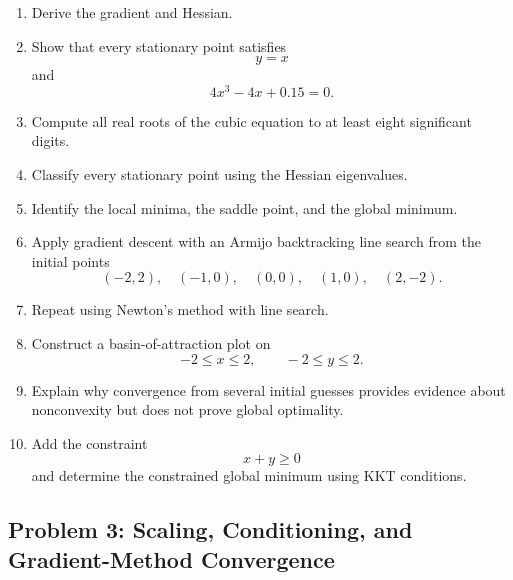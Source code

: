 \begin{enumerate}
    \item Derive the gradient and Hessian.

    \item Show that every stationary point satisfies
    \begin{equation}
    y=x
    \end{equation}
    and
    \begin{equation}
    4x^3-4x+0.15=0.
    \end{equation}

    \item Compute all real roots of the cubic equation to at least eight
    significant digits.

    \item Classify every stationary point using the Hessian eigenvalues.

    \item Identify the local minima, the saddle point, and the global minimum.

    \item Apply gradient descent with an Armijo backtracking line search from
    the initial points
    \begin{equation}
    (-2,2),\quad
    (-1,0),\quad
    (0,0),\quad
    (1,0),\quad
    (2,-2).
    \end{equation}

    \item Repeat using Newton's method with line search.

    \item Construct a basin-of-attraction plot on
    \begin{equation}
    -2\leq x\leq2,
    \qquad
    -2\leq y\leq2.
    \end{equation}

    \item Explain why convergence from several initial guesses provides
    evidence about nonconvexity but does not prove global optimality.

    \item Add the constraint
    \begin{equation}
    x+y\geq0
    \end{equation}
    and determine the constrained global minimum using KKT conditions.
\end{enumerate}


\subsection*{Problem 3: Scaling, Conditioning, and Gradient-Method Convergence}

